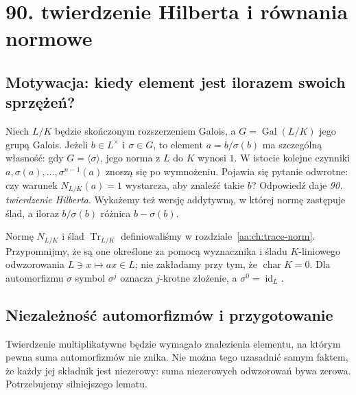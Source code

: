 \chapter{90. twierdzenie Hilberta i równania normowe}
\label{aa:ch:hilbert90}

\section{Motywacja: kiedy element jest ilorazem swoich sprzężeń?}
Niech $L/K$ będzie skończonym rozszerzeniem Galois, a $G=\operatorname{Gal}(L/K)$
jego grupą Galois. Jeżeli $b\in L^\times$ i $\sigma\in G$, to element
$a=b/\sigma(b)$ ma szczególną własność: gdy $G=\langle\sigma\rangle$, jego
norma z $L$ do $K$ wynosi $1$. W istocie kolejne czynniki
$a,\sigma(a),\ldots,\sigma^{n-1}(a)$ znoszą się po wymnożeniu.
Pojawia się pytanie odwrotne: czy warunek $N_{L/K}(a)=1$ wystarcza,
aby znaleźć takie $b$? Odpowiedź daje \emph{90. twierdzenie Hilberta}.
Wykażemy też wersję addytywną, w której normę zastępuje ślad,
a iloraz $b/\sigma(b)$ różnica $b-\sigma(b)$.

Normę $N_{L/K}$ i ślad $\operatorname{Tr}_{L/K}$ definiowaliśmy
w rozdziale~\ref{aa:ch:trace-norm}. Przypomnijmy, że są one określone
za pomocą wyznacznika i śladu $K$-liniowego odwzorowania
$L\ni x\mapsto ax\in L$; nie zakładamy przy tym, że
$\operatorname{char}K=0$. Dla automorfizmu $\sigma$ symbol $\sigma^j$
oznacza $j$-krotne złożenie, a $\sigma^0=\operatorname{id}_L$.

\section{Niezależność automorfizmów i przygotowanie}
Twierdzenie multiplikatywne będzie wymagało znalezienia elementu,
na którym pewna suma automorfizmów nie znika. Nie można tego
uzasadnić samym faktem, że każdy jej składnik jest niezerowy:
suma niezerowych odwzorowań bywa zerowa. Potrzebujemy silniejszego lematu.

